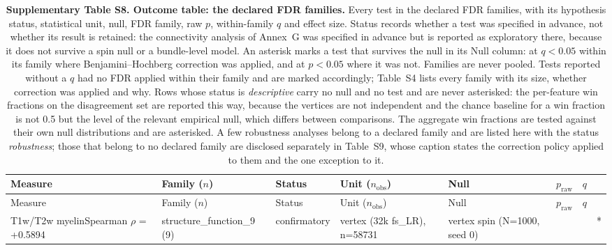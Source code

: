 {\footnotesize
\setlength{\tabcolsep}{4pt}
\begin{longtable}{>{\raggedright\arraybackslash}p{6.0cm}>{\raggedright\arraybackslash}p{3.0cm}>{\raggedright\arraybackslash}p{1.5cm}>{\raggedright\arraybackslash}p{3.8cm}>{\raggedright\arraybackslash}p{4.0cm}>{\raggedright\arraybackslash}p{1.2cm}>{\raggedright\arraybackslash}p{1.0cm}>{\raggedright\arraybackslash}p{0.5cm}}
\caption{\textbf{Supplementary Table S8. Outcome table: the declared FDR families.} Every test in the declared FDR families, with its hypothesis status, statistical unit, null, FDR family, raw $p$, within-family $q$ and effect size. Status records whether a test was specified in advance, not whether its result is retained: the connectivity analysis of Annex~G was specified in advance but is reported as exploratory there, because it does not survive a spin null or a bundle-level model. An asterisk marks a test that survives the null in its Null column: at $q<0.05$ within its family where Benjamini--Hochberg correction was applied, and at $p<0.05$ where it was not. Families are never pooled. Tests reported without a $q$ had no FDR applied within their family and are marked accordingly; Table~S4 lists every family with its size, whether correction was applied and why. Rows whose status is \emph{descriptive} carry no null and no test and are never asterisked: the per-feature win fractions on the disagreement set are reported this way, because the vertices are not independent and the chance baseline for a win fraction is not 0.5 but the level of the relevant empirical null, which differs between comparisons. The aggregate win fractions are tested against their own null distributions and are asterisked. A few robustness analyses belong to a declared family and are listed here with the status \emph{robustness}; those that belong to no declared family are disclosed separately in Table~S9, whose caption states the correction policy applied to them and the one exception to it.}\label{tab:outcomes}\\
\hline
Measure & Family ($n$) & Status & Unit ($n_{\mathrm{obs}}$) & Null & $p_{\mathrm{raw}}$ & $q$ & \\
\hline
\endfirsthead
\hline
Measure & Family ($n$) & Status & Unit ($n_{\mathrm{obs}}$) & Null & $p_{\mathrm{raw}}$ & $q$ & \\
\hline
\endhead
\hline
\endfoot
T1w/T2w myelin\newline\footnotesize Spearman $\rho$ = +0.5894 & structure\_\allowbreak{}function\_\allowbreak{}9 (9) & confirmatory & vertex (32k fs\_\allowbreak{}LR), n=58731 & vertex spin (N=1000, seed 0) & 0.001 & 0.004 & * \\

\end{longtable}}
